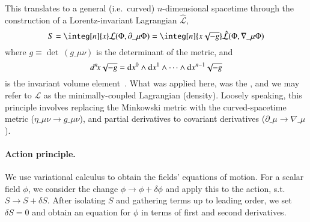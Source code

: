    This translates to a general (i.e.~curved) $n$-dimensional spacetime through the construction of a Lorentz-invariant Lagrangian $\hat{\mathcal{L}}$,
    \begin{equation}
        S = \integ[n]{x}\mathcal{L}(\Phi,  \partial\_{\mu} \Phi) =  \integ[n]{x\sqrt{-g}}\hat{\mathcal{L}}(\Phi,  \nabla\_{\mu} \Phi) 
    \end{equation}
    where $g\equiv \det~\!(g\_{\mu\nu})$ is the determinant of the metric, and 
    \begin{equation}
        d^n \! x \sqrt{-g} =  {\diff x}^0 \wedge {\diff x}^1 \wedge \cdots\wedge  {\diff x}^{n-1}\sqrt{-g}
    \end{equation} 
    is the invariant volume element~\citep{carrollSpacetimeGeometryIntroduction2019}. %
    What was applied here, was the , 
    and we may refer to $\mathcal{L}$ as the minimally-coupled Lagrangian (density). Loosely speaking, this principle involves replacing the Minkowski metric with the curved-spacetime metric ($\eta\_{\mu\nu}\to g\_{\mu\nu}$), and partial derivatives to covariant derivatives ($\partial\_{\mu} \to \nabla\_{\mu} $).
    



    \paragraph{Action principle.} %
    We use variational calculus to obtain the fields' equations of motion. For a scalar field $\phi$, we consider the change $\phi \to \phi + \delta \phi$ and apply this to the action, s.t. $S\to S+ \delta S$. %
    After isolating $S$ and gathering terms up to leading order, we set $\delta S = 0$ and obtain an equation for $\phi$ in terms of first and second derivatives. 

